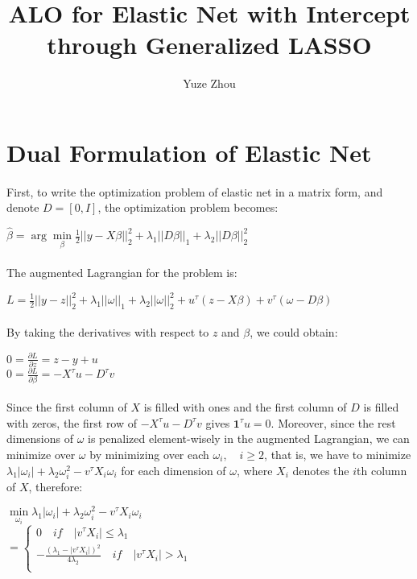 \documentclass{article}
\title{ALO for Elastic Net with Intercept through Generalized LASSO}
\author{Yuze Zhou}
\begin{document}
\section{Dual Formulation of Elastic Net}
\paragraph{}First, to write the optimization problem of elastic net in a matrix form, and denote $D =[0, I]$, the optimization problem becomes:
\begin{center}
$\hat{\beta} = \arg \min\limits_{\beta} \frac{1}{2}||y-X\beta||_{2}^{2} + \lambda_{1}||D\beta||_{1}+\lambda_{2}||D\beta||_{2}^{2}$
\end{center}
\paragraph{}The augmented Lagrangian for the problem is:
\begin{center}
$L = \frac{1}{2}||y-z||_{2}^{2} + \lambda_{1}||\omega||_{1}+\lambda_{2}||\omega||_{2}^{2} + u^{\tau}(z-X\beta) + v^{\tau}(\omega-D\beta)$
\end{center}
\paragraph{}By taking the derivatives with respect to $z$ and $\beta$, we could obtain:
\begin{center}
$0 = \frac{\partial L}{\partial z} = z-y+u$\\
$0 = \frac{\partial L}{\partial \beta} = -X^{\tau}u-D^{\tau}v$
\end{center}
\paragraph{}Since the first column of $X$ is filled with ones and the first column of $D$ is filled with zeros, the first row of $-X^{\tau}u-D^{\tau}v$ gives $\textbf{1}^{\tau} u = 0$. Moreover, since the rest dimensions of $\omega$ is penalized element-wisely in the augmented Lagrangian, we can minimize over $\omega$ by minimizing over each $\omega_{i}, \quad i \geq 2$, that is, we have to minimize $\lambda_{1}|\omega_{i}| + \lambda_{2}\omega_{i}^{2} - v^{\tau}X_{i}\omega_{i}$ for each dimension of $\omega$, where $X_{i}$ denotes the $i$th column of $X$, therefore:
\begin{center}
$\min\limits_{\omega_{i}} \lambda_{1}|\omega_{i}| + \lambda_{2}\omega_{i}^{2} - v^{\tau}X_{i}\omega_{i} $\\
$ $\\
$= \left\{
\begin{aligned}
0 \quad if \quad |v^{\tau}X_{i}| \leq \lambda_{1}\\
-\frac{(\lambda_{1}-|v^{\tau}X_{i}|)^{2}}{4\lambda_{2}} \quad if \quad |v^{\tau}X_{i}| > \lambda_{1}\\
\end{aligned}
\right.
$
\end{center}
\end{document}
